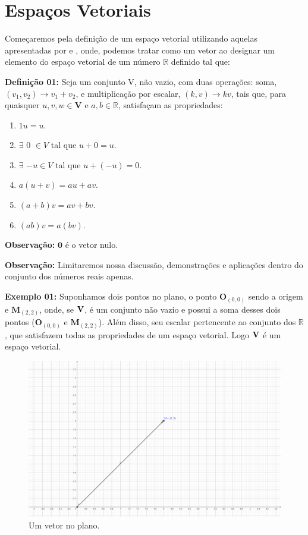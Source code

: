 \chapter{Espaços Vetoriais}
Começaremos pela definição de um espaço vetorial utilizando aquelas apresentadas por \cite{boldrini1980} e \cite{ulhoa2018}, onde, podemos tratar como um vetor ao designar um elemento do espaço vetorial de um número $\mathbb{R}$ definido tal que:

\noindent\textbf{Definição 01:} Seja um conjunto V, não vazio, com duas operações: soma, $(v_1, v_2) \rightarrow v_1 + v_2$, e multiplicação por escalar, $(k, v) \rightarrow kv$, tais que, para quaisquer $u, v, w \in \mathbf{V}$ e $a, b \in \mathbb{R}$, satisfaçam as propriedades: \nocite{boldrini1980}

\begin{enumerate}
	\item $1u = u$.
	\item $\exists$ $0$ $\in V$ tal que $u + 0 = u$.
	\item $\exists$ $-u \in V$ tal que $u + (-u) = 0$.
	\item $a(u + v) = au + av$.
	\item $(a + b)v = av + bv$.
	\item $(ab)v = a(bv)$.
\end{enumerate}

\noindent\textbf{Observação:} $\textbf{0}$ é o vetor nulo. \nocite{ulhoa2018}

\noindent\textbf{Observação:} Limitaremos nossa discussão, demonstrações e aplicações dentro do conjunto dos números reais apenas.

\noindent\textbf{Exemplo 01:} Suponhamos dois pontos no plano, o ponto $\mathbf{O}_{(0, 0)}$ sendo a origem e $\mathbf{M}_{(2, 2)}$, onde, se $\vb{V}$, é um conjunto não vazio e possui a soma desses dois pontos ($\mathbf{O}_{(0, 0)}$ e $\mathbf{M}_{(2, 2)}$). Além disso, seu escalar pertencente ao conjunto dos $\mathbb{R}$, que satisfazem todas as propriedades de um espaço vetorial. Logo $\vb{V}$ é um espaço vetorial.

\begin{figure}[H]
	\centering
	\includegraphics[scale=2.00]{exemplo01.png}
	\caption{Um vetor no plano.}
\end{figure}

